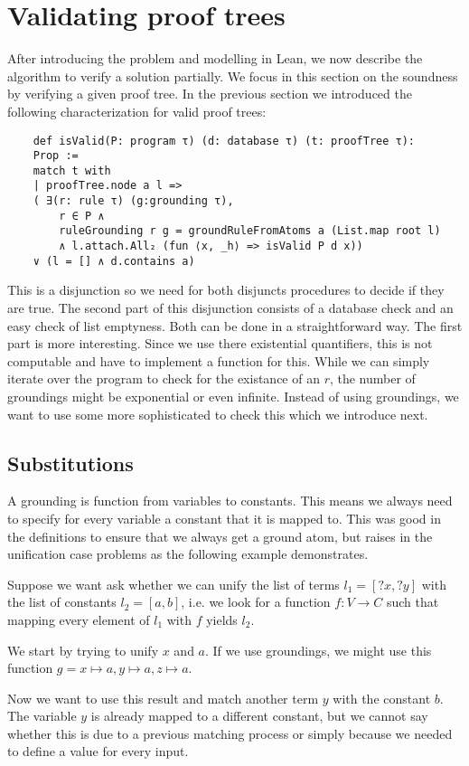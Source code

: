 \section{Validating proof trees}\label{sec:valTree}

After introducing the problem and modelling in Lean, we now describe the algorithm to verify a solution partially. We focus in this section on the soundness by verifying a given proof tree. In the previous section we introduced the following characterization for valid proof trees:

\begin{lstlisting}
    def isValid(P: program τ) (d: database τ) (t: proofTree τ): 
    Prop :=
    match t with
    | proofTree.node a l => 
    ( ∃(r: rule τ) (g:grounding τ), 
        r ∈ P ∧ 
        ruleGrounding r g = groundRuleFromAtoms a (List.map root l)
        ∧ l.attach.All₂ (fun ⟨x, _h⟩ => isValid P d x)) 
    ∨ (l = [] ∧ d.contains a)
\end{lstlisting}

This is a disjunction so we need for both disjuncts procedures to decide if they are true.
The second part of this disjunction consists of a database check and an easy check of list emptyness. Both can be done in a straightforward way.
The first part is more interesting. Since we use there existential quantifiers, this is not computable and have to implement a function for this. While we can simply iterate over the program to check for the existance of an $r$, the number of groundings might be exponential or even infinite. Instead of using groundings, we want to use some more sophisticated to check this which we introduce next.


\subsection{Substitutions}
    A grounding is function from variables to constants. This means we always need to specify for every variable a constant that it is mapped to. This was good in the definitions to ensure that we always get a ground atom, but raises in the unification case problems as the following example demonstrates.

    \begin{example}\label{ex:subsGroun}
        Suppose we want ask whether we can unify the list of terms $l_1 = [?x, ?y]$ with the list of constants $l_2= [a,b]$, i.e. we look for a function $f: V \to C$ such that mapping every element of $l_1$ with $f$ yields $l_2$.

        We start by trying to unify $x$ and $a$. If we use groundings, we might use this function $g = x \mapsto a, y \mapsto a, z \mapsto a$.

        Now we want to use this result and match another term $y$ with the constant $b$. The variable $y$ is already mapped to a different constant, but we cannot say whether this is due to a previous matching process or simply because we needed to define a value for every input.         
    \end{example}
    
